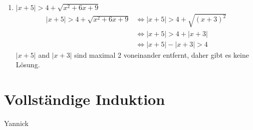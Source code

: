 \documentclass[11pt, a4paper]{article}
\providecommand{\abs}[1]{\left\lvert#1\right\rvert}
\begin{document}
\begin{enumerate}
\begin{align*}
			&\Leftrightarrow 3 < 3x \\
			&\Leftrightarrow 1 < x
			\intertext{Lösung im Fall 2: $\left[ -1, 2 \right) \cap \left( 1, \infty \right) = \left( 1,2 \right)$}
			\intertext{Fall 3: $x \in \left[ 2, \infty \right)$}
			(x-2) < \frac{(x+1)}{2} &\Leftrightarrow 2x-4 < x+1 \\
			&\Leftrightarrow x < 5
			\intertext{Lösung im Fall 3: $\left[ 2, \infty \right) \cap \left( -\infty, 5 \right) = \left[ 2,5 \right)$}
		\end{align*}
		Damit ist die Gesammtlösung: $\emptyset \cup \left( 1,2 \right) \cup \left[ 2,5 \right) = \left( 1, 5 \right)$
	\item $\abs{x+5} > 4 + \sqrt{x^2 + 6x + 9}$
		\begin{align*}
			\abs{x+5} > 4 + \sqrt{x^2 + 6x + 9} &\Leftrightarrow \abs{x+5} > 4 + \sqrt{(x+3)^2} \\
			&\Leftrightarrow \abs{x+5} > 4 + \abs{x+3} \\
			&\Leftrightarrow \abs{x+5} - \abs{x+3} > 4
		\end{align*}
		$\abs{x+5}$ and $\abs{x+3}$ sind maximal 2 voneinander entfernt, daher gibt es keine Lösung.
\end{enumerate}
\section{Vollständige Induktion}
Yannick
\end{document}
